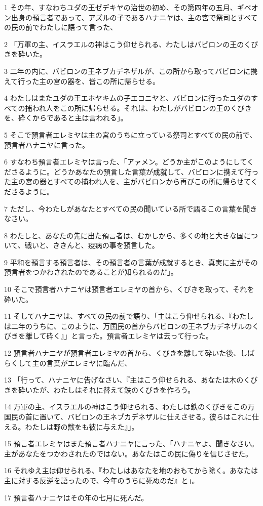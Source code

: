 \par 1 その年、すなわちユダの王ゼデキヤの治世の初め、その第四年の五月、ギベオン出身の預言者であって、アズルの子であるハナニヤは、主の宮で祭司とすべての民の前でわたしに語って言った、
\par 2 「万軍の主、イスラエルの神はこう仰せられる、わたしはバビロンの王のくびきを砕いた。
\par 3 二年の内に、バビロンの王ネブカデネザルが、この所から取ってバビロンに携えて行った主の宮の器を、皆この所に帰らせる。
\par 4 わたしはまたユダの王エホヤキムの子エコニヤと、バビロンに行ったユダのすべての捕われ人をこの所に帰らせる。それは、わたしがバビロンの王のくびきを、砕くからであると主は言われる」。
\par 5 そこで預言者エレミヤは主の宮のうちに立っている祭司とすべての民の前で、預言者ハナニヤに言った。
\par 6 すなわち預言者エレミヤは言った、「アァメン。どうか主がこのようにしてくださるように。どうかあなたの預言した言葉が成就して、バビロンに携えて行った主の宮の器とすべての捕われ人を、主がバビロンから再びこの所に帰らせてくださるように。
\par 7 ただし、今わたしがあなたとすべての民の聞いている所で語るこの言葉を聞きなさい。
\par 8 わたしと、あなたの先に出た預言者は、むかしから、多くの地と大きな国について、戦いと、ききんと、疫病の事を預言した。
\par 9 平和を預言する預言者は、その預言者の言葉が成就するとき、真実に主がその預言者をつかわされたのであることが知られるのだ」。
\par 10 そこで預言者ハナニヤは預言者エレミヤの首から、くびきを取って、それを砕いた。
\par 11 そしてハナニヤは、すべての民の前で語り、「主はこう仰せられる、『わたしは二年のうちに、このように、万国民の首からバビロンの王ネブカデネザルのくびきを離して砕く』」と言った。預言者エレミヤは去って行った。
\par 12 預言者ハナニヤが預言者エレミヤの首から、くびきを離して砕いた後、しばらくして主の言葉がエレミヤに臨んだ、
\par 13 「行って、ハナニヤに告げなさい、『主はこう仰せられる、あなたは木のくびきを砕いたが、わたしはそれに替えて鉄のくびきを作ろう。
\par 14 万軍の主、イスラエルの神はこう仰せられる、わたしは鉄のくびきをこの万国民の首に置いて、バビロンの王ネブカデネザルに仕えさせる。彼らはこれに仕える。わたしは野の獣をも彼に与えた』」。
\par 15 預言者エレミヤはまた預言者ハナニヤに言った、「ハナニヤよ、聞きなさい。主があなたをつかわされたのではない。あなたはこの民に偽りを信じさせた。
\par 16 それゆえ主は仰せられる、『わたしはあなたを地のおもてから除く。あなたは主に対する反逆を語ったので、今年のうちに死ぬのだ』と」。
\par 17 預言者ハナニヤはその年の七月に死んだ。

